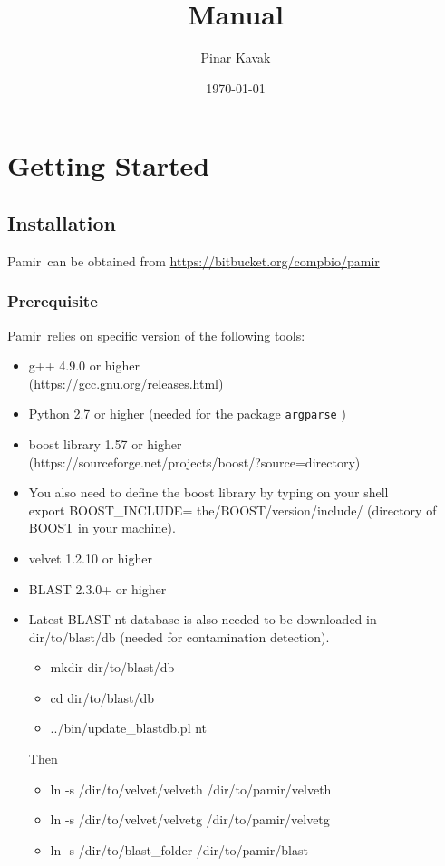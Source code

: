 \documentclass{article}
\title{\toolName Manual}
\author{Pinar Kavak}
\date{\today}
\newcommand{\toolName}{Pamir~}
\newcommand{\gitUrl}{https://bitbucket.org/compbio/pamir}
\begin{document}
\maketitle

\tableofcontents
\newpage

\section{Getting Started}

\subsection{Installation}
\toolName can be obtained from \url{\gitUrl}

\subsubsection{Prerequisite}
\toolName relies on specific version of the following tools:
\begin{itemize}
\item g++ 4.9.0 or higher \\
(https://gcc.gnu.org/releases.html)
\item Python 2.7 or higher (needed for the package \texttt{argparse} )
\item boost library 1.57 or higher \\ (https://sourceforge.net/projects/boost/?source=directory)
\item You also need to define the boost library by typing on your shell \\
export BOOST\_INCLUDE= the/BOOST/version/include/ (directory of BOOST in your machine).
\item velvet 1.2.10 or higher
\item BLAST 2.3.0+ or higher
\item Latest BLAST nt database is also needed to be downloaded in dir/to/blast/db (needed for contamination detection). 
\begin{itemize}
\item mkdir dir/to/blast/db
\item cd dir/to/blast/db
\item ../bin/update\_blastdb.pl nt
\end{itemize}
Then
\begin{itemize}
\item ln -s /dir/to/velvet/velveth /dir/to/pamir/velveth
\item ln -s /dir/to/velvet/velvetg /dir/to/pamir/velvetg
\item ln -s /dir/to/blast\_folder /dir/to/pamir/blast
\end{itemize}
\end{itemize}
\end{document}
